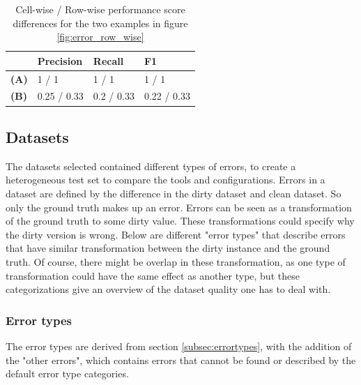 \begin{table}[]
\centering
\begin{tabular}{l|lll}
\textbf{}    & \textbf{Precision} & \textbf{Recall} & \textbf{F1} \\ \hline
\textbf{(A)} & 1 / 1              & 1 / 1           & 1 / 1       \\
\textbf{(B)} & 0.25 / 0.33        & 0.2 / 0.33      & 0.22 / 0.33
\end{tabular}
\caption{Cell-wise / Row-wise performance score differences for the two examples in figure \ref{fig:error_row_wise}}
\label{tab:cell_vs_row_scores}
\end{table}

\subsection{Datasets}
\label{subsec:datasets}
The datasets selected contained different types of errors, to create a heterogeneous test set to compare the tools and configurations. Errors in a dataset are defined by the difference in the dirty dataset and clean dataset. So only the ground truth makes up an error. Errors can be seen as a transformation of the ground truth to some dirty value. These transformations could specify why the dirty version is wrong. Below are different "error types" that describe errors that have similar transformation between the dirty instance and the ground truth. Of course, there might be overlap in these transformation, as one type of transformation could have the same effect as another type, but these categorizations give an overview of the dataset quality one has to deal with.

\subsubsection{Error types}
The error types are derived from section \ref{subsec:errortypes}, with the addition of the "other errors", which contains errors that cannot be found or described by the default error type categories.

